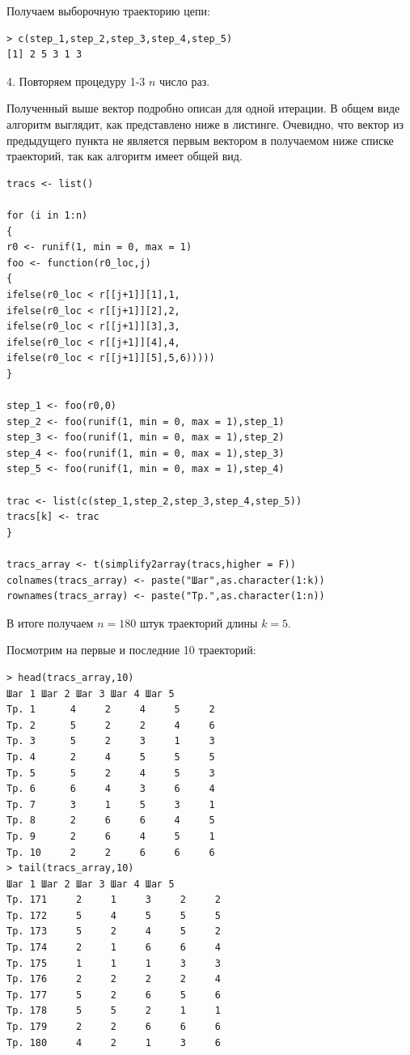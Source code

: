 \documentclass[14pt,a4paper]{scrartcl}
\begin{document}
Получаем выборочную траекторию цепи:

\begin{verbatim}
> c(step_1,step_2,step_3,step_4,step_5)
[1] 2 5 3 1 3
\end{verbatim}
	
4. Повторяем процедуру 1-3 $n$ число раз.

Полученный выше вектор подробно описан для одной итерации. В общем виде алгоритм выглядит, как представлено ниже в листинге. Очевидно, что вектор из предыдущего пункта не является первым вектором в получаемом ниже списке траекторий, так как алгоритм имеет общей вид.
\begin{verbatim}
tracs <- list()

for (i in 1:n)
{
r0 <- runif(1, min = 0, max = 1)
foo <- function(r0_loc,j)
{
ifelse(r0_loc < r[[j+1]][1],1,
ifelse(r0_loc < r[[j+1]][2],2,
ifelse(r0_loc < r[[j+1]][3],3,
ifelse(r0_loc < r[[j+1]][4],4,
ifelse(r0_loc < r[[j+1]][5],5,6)))))
}

step_1 <- foo(r0,0)
step_2 <- foo(runif(1, min = 0, max = 1),step_1)
step_3 <- foo(runif(1, min = 0, max = 1),step_2)
step_4 <- foo(runif(1, min = 0, max = 1),step_3)
step_5 <- foo(runif(1, min = 0, max = 1),step_4)

trac <- list(c(step_1,step_2,step_3,step_4,step_5))
tracs[k] <- trac
}

tracs_array <- t(simplify2array(tracs,higher = F))
colnames(tracs_array) <- paste("Шаг",as.character(1:k))
rownames(tracs_array) <- paste("Тр.",as.character(1:n))
\end{verbatim}

В итоге получаем $n=180$ штук траекторий длины $k=5$.

Посмотрим на первые и последние 10 траекторий:

\begin{verbatim}
> head(tracs_array,10)
Шаг 1 Шаг 2 Шаг 3 Шаг 4 Шаг 5
Тр. 1      4     2     4     5     2
Тр. 2      5     2     2     4     6
Тр. 3      5     2     3     1     3
Тр. 4      2     4     5     5     5
Тр. 5      5     2     4     5     3
Тр. 6      6     4     3     6     4
Тр. 7      3     1     5     3     1
Тр. 8      2     6     6     4     5
Тр. 9      2     6     4     5     1
Тр. 10     2     2     6     6     6
> tail(tracs_array,10)
Шаг 1 Шаг 2 Шаг 3 Шаг 4 Шаг 5
Тр. 171     2     1     3     2     2
Тр. 172     5     4     5     5     5
Тр. 173     5     2     4     5     2
Тр. 174     2     1     6     6     4
Тр. 175     1     1     1     3     3
Тр. 176     2     2     2     2     4
Тр. 177     5     2     6     5     6
Тр. 178     5     5     2     1     1
Тр. 179     2     2     6     6     6
Тр. 180     4     2     1     3     6
\end{verbatim}
\end{document}
